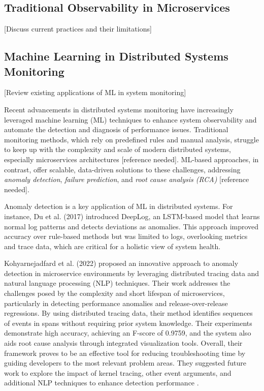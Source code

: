\documentclass[10pt,journal,compsoc]{IEEEtran}
\begin{document}
\subsection{Traditional Observability in Microservices}
[Discuss current practices and their limitations]

\subsection{Machine Learning in Distributed Systems Monitoring}
[Review existing applications of ML in system monitoring]

Recent advancements in distributed systems monitoring have increasingly leveraged machine learning (ML) techniques to enhance system observability and automate the detection and diagnosis of performance issues. Traditional monitoring methods, which rely on predefined rules and manual analysis, struggle to keep up with the complexity and scale of modern distributed systems, especially microservices architectures [reference needed]. ML-based approaches, in contrast, offer scalable, data-driven solutions to these challenges, addressing \textit{anomaly detection}, \textit {failure prediction}, and \textit {root cause analysis (RCA)} [reference needed].

Anomaly detection is a key application of ML in distributed systems. For instance, Du et al. (2017) \cite{du2017deeplog} introduced DeepLog, an LSTM-based model that learns normal log patterns and detects deviations as anomalies. This approach improved accuracy over rule-based methods but was limited to logs, overlooking metrics and trace data, which are critical for a holistic view of system health.

Kohyarnejadfard et al. (2022) proposed an innovative approach to anomaly detection in microservice environments by leveraging distributed tracing data and natural language processing (NLP) techniques. Their work addresses the challenges posed by the complexity and short lifespan of microservices, particularly in detecting performance anomalies and release-over-release regressions. By using distributed tracing data, their method identifies sequences of events in spans without requiring prior system knowledge. Their experiments demonstrate high accuracy, achieving an F-score of 0.9759, and the system also aids root cause analysis through integrated visualization tools. Overall, their framework proves to be an effective tool for reducing troubleshooting time by guiding developers to the most relevant problem areas. They suggested future work to explore the impact of kernel tracing, other event arguments, and additional NLP techniques to enhance detection performance \cite{kohyarnejadfard2022anomaly}.
\end{document}
